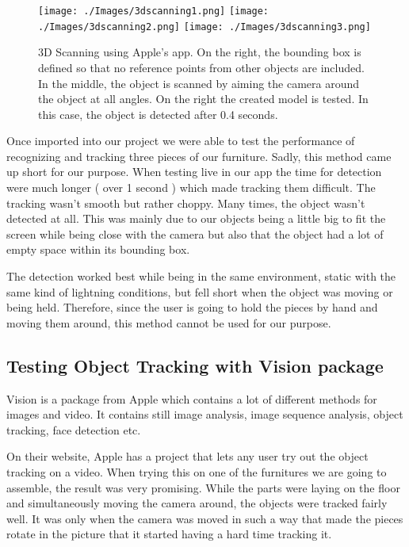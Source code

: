 

\begin{figure}[hbtp]
\begin{center}
\texttt{[image: ./Images/3dscanning1.png]}
\texttt{[image: ./Images/3dscanning2.png]}
\texttt{[image: ./Images/3dscanning3.png]} 
\caption{3D Scanning using Apple's app. On the right, the bounding box is defined so that no reference points from other objects are included. In the middle, the object is scanned by aiming the camera around the object at all angles. On the right the created model is tested. In this case, the object is detected after 0.4 seconds.}
\end{center}
\end{figure}

Once imported into our project we were able to test the performance of recognizing and tracking three pieces of our furniture.
Sadly, this method came up short for our purpose. When testing live in our app the time for detection were much longer ( over 1 second ) which made tracking them difficult. The tracking wasn't smooth but rather choppy. Many times, the object wasn't detected at all. This was mainly due to our objects being a little big to fit the screen while being close with the camera but also that the object had a lot of empty space within its bounding box.

The detection worked best while being in the same environment, static with the same kind of lightning conditions, but fell short when the object was moving or being held. Therefore, since the user is going to hold the pieces by hand and moving them around, this method cannot be used for our purpose.

\subsection{Testing Object Tracking with Vision package}
Vision is a package from Apple which contains a lot of different methods for images and video. It contains still image analysis, image sequence analysis, object tracking, face detection etc.

On their website, Apple has a project that lets any user try out the object tracking on a video. When trying this on one of the furnitures we are going to assemble, the result was very promising. While the parts were laying on the floor and simultaneously moving the camera around, the objects were tracked fairly well. It was only when the camera was moved in such a way that made the pieces rotate in the picture that it started having a hard time tracking it.

